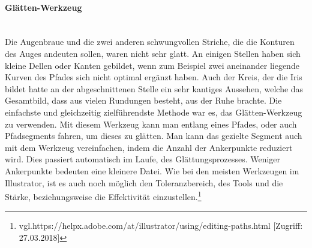 \paragraph{Glätten-Werkzeug}
\leavevmode \\
Die Augenbraue und die zwei anderen schwungvollen Striche, die die Konturen des Auges andeuten sollen, waren nicht sehr glatt. An einigen Stellen haben sich kleine Dellen oder Kanten gebildet, wenn zum Beispiel zwei aneinander liegende Kurven des Pfades sich nicht optimal ergänzt haben. Auch der Kreis, der die Iris bildet hatte an der abgeschnittenen Stelle ein sehr kantiges Aussehen, welche das Gesamtbild, dass aus vielen Rundungen besteht, aus der Ruhe brachte. Die einfachste und gleichzeitig zielführendste Methode war es, das Glätten-Werkzeug zu verwenden. Mit diesem Werkzeug kann man entlang eines Pfades, oder auch Pfadsegments fahren, um dieses zu glätten. Man kann das gezielte Segment auch mit dem Werkzeug vereinfachen, indem die Anzahl der Ankerpunkte reduziert wird. Dies passiert automatisch im Laufe, des Glättungsprozesses. Weniger Ankerpunkte bedeuten eine kleinere Datei. Wie bei den meisten Werkzeugen im Illustrator, ist es auch noch möglich den Toleranzbereich, des Tools und die Stärke, beziehungsweise die Effektivität einzustellen.\footnote{\label{} vgl.https://helpx.adobe.com/at/illustrator/using/editing-paths.html  [Zugriff: 27.03.2018]}

